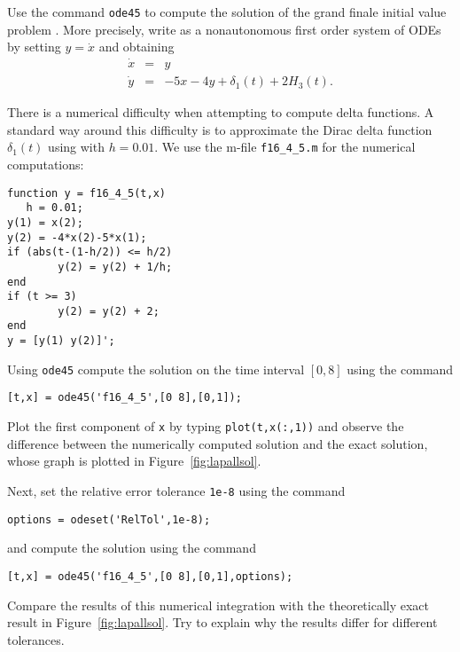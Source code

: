 \begin{exercise} \label{c13.4.5}
Use the \Matlab command {\tt ode45} to compute the solution of the grand 
finale initial value problem .  
More precisely, write  as a nonautonomous first order 
system of ODEs by setting $y=\dot{x}$ and obtaining
\begin{equation*}
\begin{array}{rcl}
\dot{x} & = & y \\
\dot{y} & = & -5x-4y+\delta_1(t)+2H_3(t).
\end{array}
\end{equation*}

There is a numerical difficulty when attempting to compute delta functions. 
A standard way around this difficulty is to approximate the Dirac delta 
function $\delta_1(t)$ using  with $h=0.01$.  We use the 
\Matlab m-file {\tt f16\_4\_5.m} for the numerical computations:
\begin{verbatim}
function y = f16_4_5(t,x)
   h = 0.01;
y(1) = x(2);
y(2) = -4*x(2)-5*x(1);
if (abs(t-(1-h/2)) <= h/2)
        y(2) = y(2) + 1/h;
end
if (t >= 3)
        y(2) = y(2) + 2;
end
y = [y(1) y(2)]';
\end{verbatim}

Using {\tt ode45} compute the solution on the 
time interval $[0,8]$ using the command
\begin{verbatim}
[t,x] = ode45('f16_4_5',[0 8],[0,1]); 
\end{verbatim}
Plot the first component of {\tt x} by typing {\tt plot(t,x(:,1))} and observe 
the difference between the numerically computed solution and the exact 
solution, whose graph is plotted in Figure~\ref{fig:lapallsol}.

Next, set the relative error tolerance {\tt 1e-8} using the command
\begin{verbatim}
options = odeset('RelTol',1e-8);
\end{verbatim}
and compute the solution using the command
\begin{verbatim}
[t,x] = ode45('f16_4_5',[0 8],[0,1],options); 
\end{verbatim}
Compare the results of this numerical integration with the theoretically exact 
result in Figure~\ref{fig:lapallsol}.  Try to explain why the results differ 
for different tolerances.
\end{exercise}


  \label{S:SOFE}

